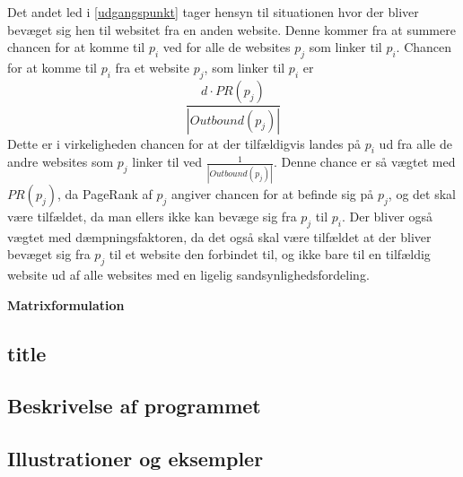 Det andet led i \eqref{udgangspunkt} tager hensyn til situationen hvor der bliver bevæget sig hen til websitet fra en anden website. Denne kommer fra at summere chancen for at komme til $p_i$ ved for alle de websites $p_j$ som linker til $p_i$. Chancen for at komme til $p_i$ fra et website $p_j$, som linker til $p_i$ er
\begin{equation*}
    \frac{d\cdot PR(p_j)}{\left|Outbound(p_j)\right|}
\end{equation*}
Dette er i virkeligheden chancen for at der tilfældigvis landes på $p_i$ ud fra alle de andre websites som $p_j$ linker til ved $\frac1{\left|Outbound(p_j)\right|}$. Denne chance er så vægtet med $PR(p_j)$, da PageRank af $p_j$ angiver chancen for at befinde sig på $p_j$, og det skal være tilfældet, da man ellers ikke kan bevæge sig fra $p_j$ til $p_i$. Der bliver også vægtet med dæmpningsfaktoren, da det også skal være tilfældet at der bliver bevæget sig fra $p_j$ til et website den forbindet til, og ikke bare til en tilfældig website ud af alle websites med en ligelig sandsynlighedsfordeling.



\textbf{Matrixformulation}


\subsection*{title}

\subsection*{Beskrivelse af programmet}




\subsection*{Illustrationer og eksempler}